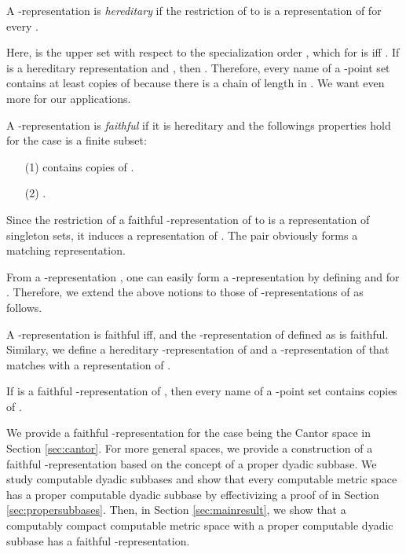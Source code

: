 \documentclass{eptcs-modified}
\begin{document}
\begin{definition}\label{def:hereditary}
A -representation  is \emph{hereditary} if the restriction of  to  is a
representation of 
for every .
\end{definition}
Here,   is the upper set with respect to the specialization order ,  which for  is   iff .
If  is a hereditary representation and , then .
Therefore, every name of a -point set  contains at least  copies of  because there is a chain of length  in .
We want even more for our applications.
\begin{definition}\label{def:faithful}
A -representation  is \emph{faithful} if it is hereditary and the followings properties hold for the case  is a finite subset:
\begin{itemize}

\item[(1)]  contains  copies of .
\item[(2)] .
\end{itemize}
\end{definition}

Since the restriction of a faithful  -representation  of 
to  is a representation of singleton sets,
it induces a representation  of .
The pair  obviously forms a matching representation.

From a -representation , one can easily form a -representation
 by defining  and
 for .
Therefore, we extend the above notions to those of -representations of  as follows.
\begin{definition}\label{def:match2}
A -representation   is faithful
iff,   and the -representation  of
 defined as  is
faithful.  Similary, we define a hereditary -representation of 
and a -representation of  that
matches with a representation  of .
\end{definition}
If  is a faithful -representation of , then
every name of a -point set contains  copies of .

We provide a faithful -representation for the case  being the Cantor space  in Section \ref{sec:cantor}.
For more general spaces,
we  provide a construction of a faithful -representation
based on the concept of a proper dyadic subbase.
We study computable dyadic subbases
and  show that every computable metric space has a proper computable dyadic subbase by effectivizing a proof of  \cite{tsukamoto} in Section
\ref{sec:propersubbases}.
Then, in Section \ref{sec:mainresult},
we show that a computably compact computable metric space with a proper computable dyadic subbase has a faithful -representation.
\end{document}
